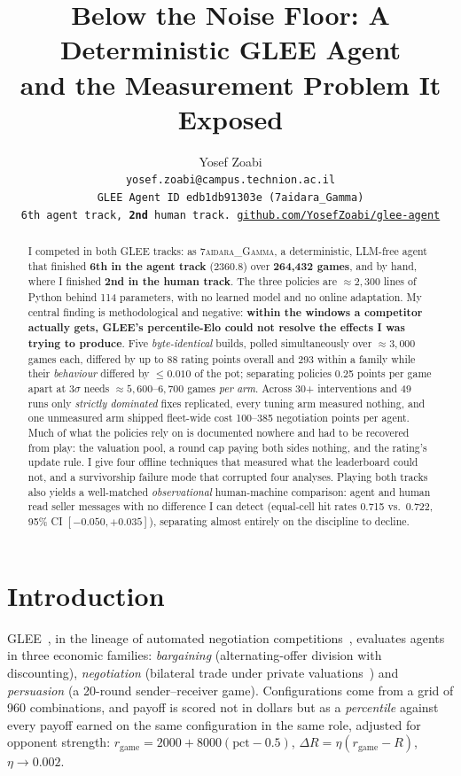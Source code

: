 \documentclass{article}
\title{Below the Noise Floor: A Deterministic GLEE Agent\\
       and the Measurement Problem It Exposed}
\author{%
  Yosef Zoabi\\
  \texttt{yosef.zoabi@campus.technion.ac.il}\\
  \texttt{\small GLEE Agent ID \texttt{edb1db91303e} (7aidara\_Gamma)}\\
  \texttt{\small 6th agent track, \textbf{2nd} human track. \href{https://github.com/YosefZoabi/glee-agent}{github.com/YosefZoabi/glee-agent}}
}
\newcommand{\tbf}[1]{\textbf{#1}}
\begin{document}
\maketitle

\begin{abstract}
I competed in both GLEE tracks: as \textsc{7aidara\_Gamma}, a deterministic,
LLM-free agent that finished \tbf{6th in the agent track} (2360.8) over
\tbf{264{,}432 games}, and by hand, where I finished \tbf{2nd in the human
track}. The three policies are ${\approx}2{,}300$ lines of Python behind 114
parameters, with no learned model and no online adaptation. My central finding is
methodological and negative: \tbf{within the windows a competitor actually gets,
GLEE's percentile-Elo could not resolve the effects I was trying to produce}.
Five \emph{byte-identical} builds, polled simultaneously over ${\approx}3{,}000$
games each, differed by up to 88 rating points overall and 293 within a family
while their \emph{behaviour} differed by ${\le}0.010$ of the pot; separating
policies 0.25 points per game apart at $3\sigma$ needs
${\approx}5{,}600$--$6{,}700$ games \emph{per arm}. Across 30+ interventions and
49 runs only \emph{strictly dominated} fixes replicated, every tuning arm
measured nothing, and one unmeasured arm shipped fleet-wide cost 100--385
negotiation points per agent. Much of what the policies rely on is documented
nowhere and had to be recovered from play: the valuation pool, a round cap paying
both sides nothing, and the rating's update rule. I give four offline techniques
that measured what the leaderboard could not, and a survivorship failure mode
that corrupted four analyses. Playing both tracks also
yields a well-matched \emph{observational} human-machine comparison: agent and
human read seller messages with no difference I can detect (equal-cell hit rates
0.715 vs.\ 0.722, 95\% CI $[-0.050,+0.035]$), separating almost entirely on the
discipline to decline.
\end{abstract}

\section{Introduction}

GLEE~\cite{shapira2024glee}, in the lineage of automated negotiation
competitions~\cite{anac2011,baarslag2014decoupling}, evaluates agents in three economic
families: \emph{bargaining} (alternating-offer division with discounting),
\emph{negotiation} (bilateral trade under private valuations~\cite{myerson1983}) and
\emph{persuasion} (a 20-round sender--receiver game). Configurations come from a
grid of 960 combinations, and payoff is scored not in dollars but as a
\emph{percentile} against every payoff earned on the same configuration in the
same role, adjusted for opponent strength:
$r_{\text{game}} {=} 2000 + 8000(\text{pct}{-}0.5)$,
$\Delta R {=} \eta(r_{\text{game}}{-}R)$, $\eta \to 0.002$.
\end{document}
